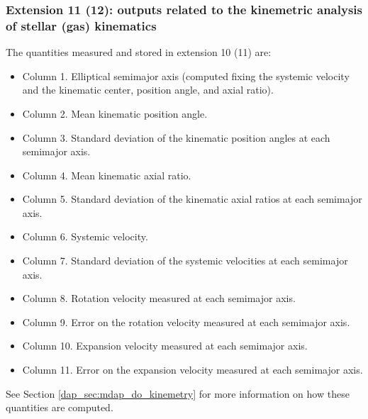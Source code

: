\subsubsection{Extension 11 (12): outputs related to the kinemetric analysis of stellar (gas) kinematics}
The quantities measured and stored in extension 10 (11) are:
\begin{itemize}
\item Column 1. Elliptical semimajor axis (computed fixing the systemic velocity and the kinematic center, position angle, and axial ratio).
\item Column 2. Mean kinematic position angle.
\item Column 3. Standard deviation of the kinematic position angles at each semimajor axis.
\item Column 4. Mean kinematic axial ratio.
\item Column 5. Standard deviation of the kinematic axial ratios at each semimajor axis.
\item Column 6. Systemic velocity.
\item Column 7. Standard deviation of the systemic velocities at each semimajor axis.
\item Column 8. Rotation velocity measured at each semimajor axis.
\item Column 9. Error on the rotation velocity measured at each semimajor axis.
\item Column 10. Expansion velocity measured at each semimajor axis.
\item Column 11. Error on the expansion velocity measured at each semimajor axis.

\end{itemize}



See Section \ref{dap_sec:mdap_do_kinemetry} for more information on how these quantities are computed.

